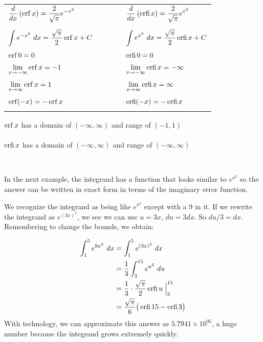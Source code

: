 {\begin{center}
\begin{tabular}{lllll}
$\displaystyle \frac{d}{dx} \left( \operatorname{erf} x \right) = \frac{2}{\sqrt{\pi}} e^{-x^2}$ &&&& $\displaystyle \frac{d}{dx} \left( \operatorname{erfi} x \right) = \frac{2}{\sqrt{\pi}} e^{x^2}$\\\\
$\displaystyle \int e^{-x^2}\ dx =  \frac{\sqrt{\pi}}{2}\operatorname{erf} x +C$ &&&& $\displaystyle \int e^{x^2}\ dx =  \frac{\sqrt{\pi}}{2}\operatorname{erfi} x +C$\\\\
$\operatorname{erf} 0 =0$ &&&& $\operatorname{erfi} 0 = 0$\\\\
$\displaystyle \lim_{x\to -\infty} \operatorname{erf} x = -1$ &&&& $\displaystyle \lim_{x\to -\infty} \operatorname{erfi} x = -\infty$\\\\
$\displaystyle \lim_{x\to \infty} \operatorname{erf} x = 1$ &&&& $\displaystyle \lim_{x\to \infty} \operatorname{erfi} x = \infty$\\\\
$\operatorname{erf}(-x) = -\operatorname{erf} x$ &&&& $\operatorname{erfi}(-x) = -\operatorname{erfi} x$\\\\
\end{tabular}
\end{center}
$\operatorname{erf} x$ has a domain of $(-\infty,\infty)$ and range of $(-1,1)$\\\\
$\operatorname{erfi} x$ has a domain of $(-\infty,\infty)$ and range of $(-\infty,\infty)$
}\\\clearpage

In the next example, the integrand has a function that looks similar to $e^{x^2}$ so the answer can be written in exact form in terms of the imaginary error function.\\

{We recognize the integrand as being like $e^{x^2}$ except with a 9 in it.  If we rewrite the integrand as $e^{(3x)^2}$, we see we can use $u=3x$, $du=3dx$.  So $du/3=dx$.  Remembering to change the bounds, we obtain:

\begin{align*}
\int_1^5 e^{9x^2} \ dx &=	\int_1^5 e^{(3x)^2} \ dx \\
								&= \frac{1}{3}\int_3^{15} e^{u^2} \ du \\
								&= \frac{1}{3} \cdot \frac{\sqrt{\pi}}{2} \erfi u\;\Big|_3^{15} \\
								&= \frac{\sqrt{\pi}}{6}\big(\erfi 15 - \erfi 3\big)
\end{align*}
With technology, we can approximate this answer as $5.7941\times 10^{95}$, a huge number because the integrand grows extremely quickly.
}\\

